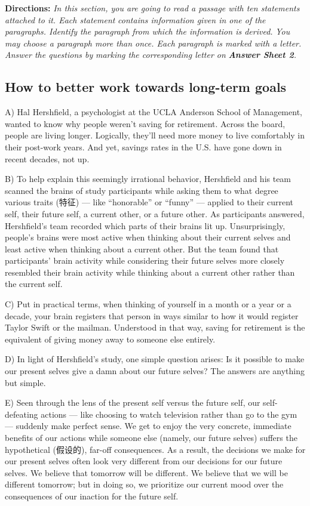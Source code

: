 \documentclass[UTF8,11pt]{ctexart}
\begin{document}
\textbf{Directions:} \textit{In this section, you are going to read a passage with ten statements attached to it. Each statement} \textit{contains information given in one of the paragraphs. Identify the paragraph from which the information is derived.} \textit{You may choose a paragraph more than once. Each paragraph is marked with a letter. Answer the questions by} \textit{marking the corresponding letter on }\textbf{\textit{Answer Sheet 2}}\textit{.}


\subsection*{\textbf{How to better work towards long-term goals}}


A) Hal Hershfield, a psychologist at the UCLA Anderson School of Management, wanted to know why people weren’t saving for retirement. Across the board, people are living longer. Logically, they’ll need more money to live comfortably in their post-work years. And yet, savings rates in the U.S. have gone down in recent decades, not up.


B) To help explain this seemingly irrational behavior, Hershfield and his team scanned the brains of study participants while asking them to what degree various traits (特征) — like “honorable” or “funny” — applied to their current self, their future self, a current other, or a future other. As participants answered, Hershfield’s team recorded which parts of their brains lit up. Unsurprisingly, people’s brains were most active when thinking about their current selves and least active when thinking about a current other. But the team found that participants’ brain activity while considering their future selves more closely resembled their brain activity while thinking about a current other rather than the current self.


C) Put in practical terms, when thinking of yourself in a month or a year or a decade, your brain registers that person in ways similar to how it would register Taylor Swift or the mailman. Understood in that way, saving for retirement is the equivalent of giving money away to someone else entirely.


D) In light of Hershfield’s study, one simple question arises: Is it possible to make our present selves give a damn about our future selves? The answers are anything but simple.


E) Seen through the lens of the present self versus the future self, our self-defeating actions — like choosing to watch television rather than go to the gym — suddenly make perfect sense. We get to enjoy the very concrete, immediate benefits of our actions while someone else (namely, our future selves) suffers the hypothetical (假设的), far-off consequences. As a result, the decisions we make for our present selves often look very different from our decisions for our future selves. We believe that tomorrow will be different. We believe that we will be different tomorrow; but in doing so, we prioritize our current mood over the consequences of our inaction for the future self.
\end{document}
